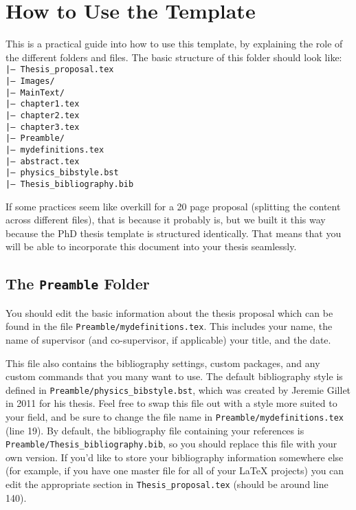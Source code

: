 \chapter{How to Use the Template} \label{ch-2}

This is a practical guide into how to use this template, by explaining the role
of the different folders and files. The basic structure of this folder should
look like:
\texttt{
\\
|--- Thesis\_proposal.tex \\ 
|--- Images/ \\ 
|--- MainText/ \\ 
\hspace*{0.5cm}|--- chapter1.tex\\
\hspace*{0.5cm}|--- chapter2.tex\\
\hspace*{0.5cm}|--- chapter3.tex\\
|--- Preamble/ \\ 
\hspace*{0.5cm}|--- mydefinitions.tex\\
\hspace*{0.5cm}|--- abstract.tex\\
\hspace*{0.5cm}|--- physics\_bibstyle.bst\\
\hspace*{0.5cm}|--- Thesis\_bibliography.bib\\
}

If some practices seem like overkill for a 20 page proposal (splitting the
content across different files), that is because it probably is, but we built
it this way because the PhD thesis template is structured identically. That
means that you will be able to incorporate this document into your thesis seamlessly.

\section{The \texttt{Preamble} Folder}

You should edit the basic information about the thesis proposal
which can be found in the file \texttt{Preamble/mydefinitions.tex}. This includes
your name, the name of supervisor (and co-supervisor, if applicable) your title, 
and the date.

This file also contains the bibliography settings, custom packages, and any custom
commands that you many want to use. The default bibliography style is defined in
\texttt{Preamble/physics\_bibstyle.bst}, which was created by Jeremie Gillet in 2011
for his thesis. Feel free to swap this file out with a style more suited to your
field, and be sure to change the file name in \texttt{Preamble/mydefinitions.tex}
(line 19). By default, the bibliography file containing
your references is \texttt{Preamble/Thesis\_bibliography.bib}, so you should
replace this file with your own version. If you'd like to store your bibliography
information somewhere else (for example, if you have one master file for all of your
LaTeX projects) you can edit the appropriate section in \texttt{Thesis\_proposal.tex}
(should be around line 140).

